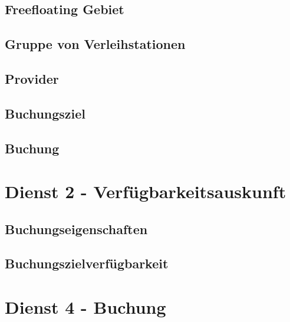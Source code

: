 \subsection*{Freefloating Gebiet}



\subsection*{Gruppe von Verleihstationen}



\subsection*{Provider}



\subsection*{Buchungsziel}



\subsection*{Buchung}



\section{Dienst 2 - Verfügbarkeitsauskunft}
\label{sec:Datenmodell:Dienst2}

\subsection*{Buchungseigenschaften}



\subsection*{Buchungszielverfügbarkeit}



\section{Dienst 4 - Buchung}
\label{sec:Datenmodell:Dienst4}


